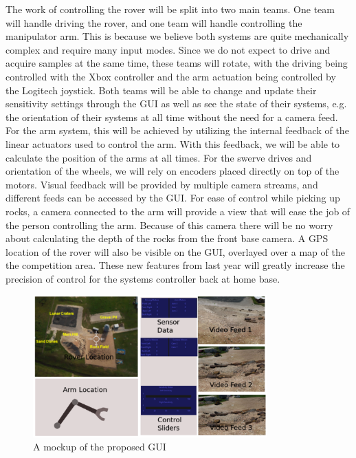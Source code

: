 \documentclass[titlepage,twocolumn,10pt]{article}
\begin{document}
    The work of controlling the rover will be split into two main teams. One team will handle driving the rover, and one team will handle controlling the manipulator arm. This is because we believe both systems are quite mechanically complex and require many input modes. Since we do not expect to drive and acquire samples at the same time, these teams will rotate, with the driving being controlled with the Xbox controller and the arm actuation being controlled by the Logitech joystick. Both teams will be able to change and update their sensitivity settings through the GUI as well as see the state of their systems, e.g. the orientation of their systems at all time without the need for a camera feed. For the arm system, this will be achieved by utilizing the internal feedback of the linear actuators used to control the arm. With this feedback, we will be able to calculate the position of the arms at all times. For the swerve drives and orientation of the wheels, we will rely on encoders placed directly on top of the motors. Visual feedback will be provided by multiple camera streams, and different feeds can be accessed by the GUI. For ease of control while picking up rocks, a camera connected to the arm will provide a view that will ease the job of the person controlling the arm. Because of this camera there will be no worry about calculating the depth of the rocks from the front base camera. A GPS location of the rover will also be visible on the GUI, overlayed over a map of the the competition area. These new features from last year will greatly increase the precision of control for the systems controller back at home base.

    \begin{figure}[H]
        \centering
        \includegraphics*[width = 9cm]{images/gui.png}
        \caption{A mockup of the proposed GUI}
    \end{figure}
\end{document}
